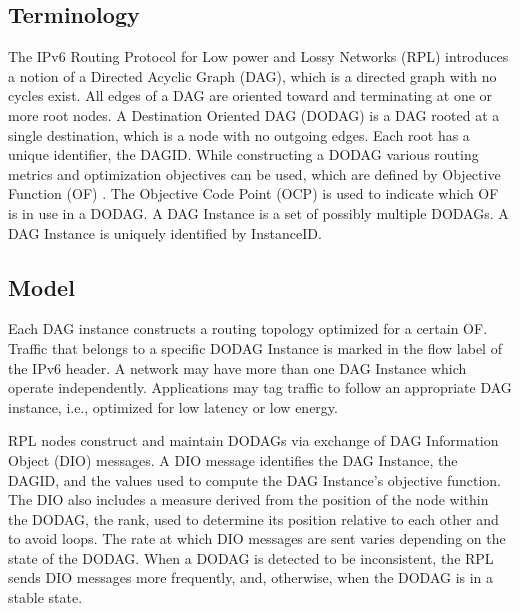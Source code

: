 \subsection{Terminology}
The IPv6 Routing Protocol for Low power and Lossy Networks (RPL) introduces a notion of a Directed Acyclic Graph (DAG), which is a directed graph with no cycles exist. All edges of a DAG are oriented toward and terminating at one or more root nodes. A Destination Oriented DAG (DODAG) is a DAG rooted at a single destination, which is a node with no outgoing edges.  Each root has a unique identifier, the DAGID. While constructing a DODAG various routing metrics and optimization objectives can be used, which are defined by Objective Function (OF) \cite{draft-routing-metrics-04}.  The Objective Code Point (OCP) is used to indicate which OF is in use in a DODAG. A DAG Instance is a set of possibly multiple DODAGs. A DAG Instance is uniquely identified by InstanceID. 

\subsection{Model}
Each DAG instance constructs a routing topology optimized for a certain OF. Traffic that belongs to a specific DODAG Instance is marked in the flow label of the IPv6 header. A network may have more than one DAG Instance which operate independently. Applications may tag traffic to follow an appropriate DAG instance, i.e., optimized for low latency or low energy.  

RPL nodes construct and maintain DODAGs via exchange of DAG Information Object (DIO) messages. A DIO message identifies the DAG Instance, the DAGID, and the values used to compute the DAG Instance's objective function. The DIO also includes a measure derived from the position of the node within the DODAG, the rank, used to determine its position relative to each other and to avoid loops. The rate at which DIO messages are sent varies depending on the state of the DODAG. When a DODAG is detected to be inconsistent, the RPL sends DIO messages more frequently, and, otherwise, when the DODAG is in a stable state.



